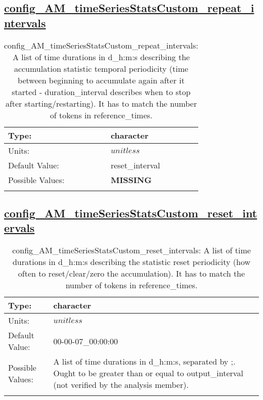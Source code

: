 \subsection[config\_AM\_timeSeriesStatsCustom\_repeat\_intervals]{\hyperref[sec:nm_tab_AM_timeSeriesStatsCustom]{config\_AM\_timeSeriesStatsCustom\_repeat\_intervals}}
\label{subsec:nm_sec_config_AM_timeSeriesStatsCustom_repeat_intervals}
\begin{center}
\begin{longtable}{| p{2.0in} || p{4.0in} |}
    \hline
    Type: & character \\
    \hline
    Units: & $unitless$ \\
    \hline
    Default Value: & reset\_interval \\
    \hline
    Possible Values: & {\bf \color{red} MISSING} \\
    \hline
    \caption{config\_AM\_timeSeriesStatsCustom\_repeat\_intervals: A list of time durations in d\_h:m:s describing the accumulation statistic temporal periodicity (time between beginning to accumulate again after it started - duration\_interval describes when to stop after starting/restarting). It has to match the number of tokens in reference\_times.}
\end{longtable}
\end{center}
\subsection[config\_AM\_timeSeriesStatsCustom\_reset\_intervals]{\hyperref[sec:nm_tab_AM_timeSeriesStatsCustom]{config\_AM\_timeSeriesStatsCustom\_reset\_intervals}}
\label{subsec:nm_sec_config_AM_timeSeriesStatsCustom_reset_intervals}
\begin{center}
\begin{longtable}{| p{2.0in} || p{4.0in} |}
    \hline
    Type: & character \\
    \hline
    Units: & $unitless$ \\
    \hline
    Default Value: & 00-00-07\_00:00:00 \\
    \hline
    Possible Values: & A list of time durations in d\_h:m:s, separated by ;. Ought to be greater than or equal to output\_interval (not verified by the analysis member). \\
    \hline
    \caption{config\_AM\_timeSeriesStatsCustom\_reset\_intervals: A list of time durations in d\_h:m:s describing the statistic reset periodicity (how often to reset/clear/zero the accumulation). It has to match the number of tokens in reference\_times.}
\end{longtable}
\end{center}

